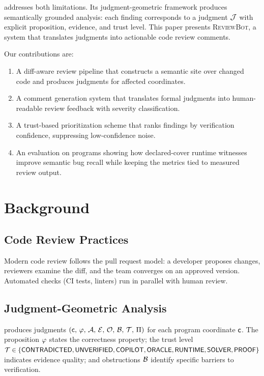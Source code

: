 \documentclass[11pt]{article}
\newcommand{\ReviewBot}{\textsc{ReviewBot}}
\begin{document}
\JuGeo{} addresses both limitations. Its judgment-geometric framework
produces semantically grounded analysis: each finding corresponds to a
judgment $\mathcal{J}$ with explicit proposition, evidence, and trust level. This
paper presents \ReviewBot{}, a system that translates \JuGeo{} judgments
into actionable code review comments.

Our contributions are:
\begin{enumerate}[leftmargin=*]
  \item A diff-aware review pipeline that constructs a semantic site over
        changed code and produces judgments for affected coordinates.
  \item A comment generation system that translates formal judgments into
        human-readable review feedback with severity classification.
  \item A trust-based prioritization scheme that ranks findings by
        verification confidence, suppressing low-confidence noise.
  \item An evaluation on \ppLXVIIprogramCount{} programs showing how declared-cover
        runtime witnesses improve semantic bug recall while keeping the
        metrics tied to measured review output.
\end{enumerate}

\section{Background}\label{sec:background}

\subsection{Code Review Practices}

Modern code review follows the pull request model: a developer proposes
changes, reviewers examine the diff, and the team converges on an approved
version. Automated checks (CI tests, linters) run in parallel with human
review.

\subsection{Judgment-Geometric Analysis}

\JuGeo{} produces judgments $(\mathsf{c},\,\varphi,\,\mathcal{A},\,\mathcal{E},\,\mathcal{O},\,\mathcal{B},\,\mathcal{T},\,\Pi)$ for each program coordinate $\mathsf{c}$. The
proposition $\varphi$ states the correctness property; the trust level
$\mathcal{T} \in \{\mathsf{CONTRADICTED}, \mathsf{UNVERIFIED}, \mathsf{COPILOT}, \mathsf{ORACLE}, \mathsf{RUNTIME}, \mathsf{SOLVER},
\mathsf{PROOF}\}$ indicates evidence quality; and obstructions $\mathcal{B}$ identify
specific barriers to verification.
\end{document}
